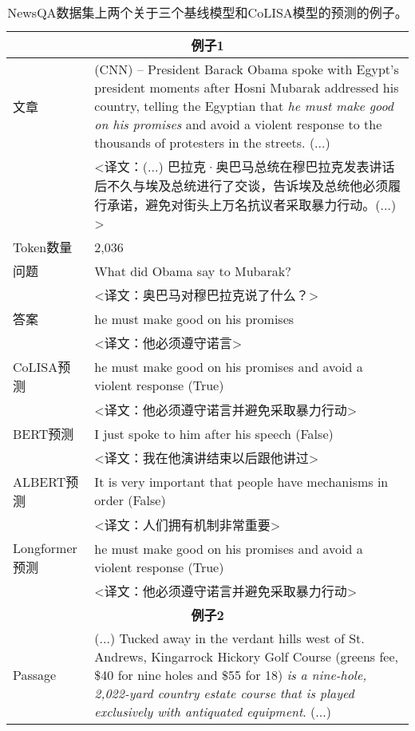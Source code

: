 \begin{table}[htbp]\scriptsize
    \centering
    \caption{NewsQA数据集上两个关于三个基线模型和CoLISA模型的预测的例子。}
    \begin{tabular}{p{70pt}|p{320pt}}
         \hline
         \multicolumn{2}{c}{\bfseries 例子1} \\
         \hline
         文章 & (CNN) -- President Barack Obama spoke with Egypt's president moments after Hosni Mubarak addressed his country, telling the Egyptian that \textcolor[rgb]{1,0,0.2}{\itshape he must make good on his promises} and avoid a violent response to the thousands of protesters in the streets. (...) \\
         & <译文：(...) 巴拉克·奥巴马总统在穆巴拉克发表讲话后不久与埃及总统进行了交谈，告诉埃及总统他必须履行承诺，避免对街头上万名抗议者采取暴力行动。(...) > \\
         \hline
         Token数量 & 2,036 \\
         \hline
         问题 & What did Obama say to Mubarak? \\
         & <译文：奥巴马对穆巴拉克说了什么？> \\
         \hline
         答案 & he must make good on his promises \\
         & <译文：他必须遵守诺言> \\
         \hline
         CoLISA预测 & \textcolor[rgb]{1,0.4,0.3}{he must make good on his promises and avoid a violent response (True)} \\
         & <译文：他必须遵守诺言并避免采取暴力行动> \\
         \hline
         BERT预测 & \textcolor[rgb]{0.4,0.7,0.9}{I just spoke to him after his speech (False)} \\
         & <译文：我在他演讲结束以后跟他讲过> \\
         \hline
         ALBERT预测 & \textcolor[rgb]{0.4,0.7,0.9}{It is very important that people have mechanisms in order (False)} \\
         & <译文：人们拥有机制非常重要> \\
         \hline
         Longformer预测 & \textcolor[rgb]{0.4,0.7,0.9}{he must make good on his promises and avoid a violent response (True)} \\
         & <译文：他必须遵守诺言并避免采取暴力行动> \\
         \hline
         \hline
         \multicolumn{2}{c}{\bfseries 例子2} \\
         \hline
         Passage & (...) Tucked away in the verdant hills west of St. Andrews, Kingarrock Hickory Golf Course (greens fee, \$40 for nine holes and \$55 for 18) \textcolor[rgb]{1,0,0.2}{\itshape is a nine-hole, 2,022-yard country estate course that is played exclusively with antiquated equipment}. (...) \\

\end{tabular}
\end{table}

